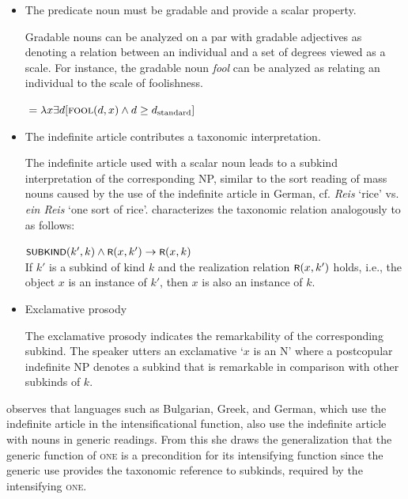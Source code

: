 \documentclass[output=paper,colorlinks,citecolor=brown]{langscibook}
\begin{document}
\begin{itemize}
    \item[C1] The predicate noun must be gradable and provide a scalar property.\smallskip

    Gradable nouns can be analyzed on a par with gradable adjectives as denoting a relation between an individual and a set of degrees viewed as a scale. For instance, the gradable noun \textit{fool} can be analyzed as relating an individual to the scale of foolishness.

    \ea {}${}=\lambda x\exists d[\textsc{fool}(d,x)\wedge d\geq d_{\text{standard}}]$\hfill\citep[42]{Gorishneva2009}
    \z

    \item[C2] The indefinite article contributes a taxonomic interpretation.\smallskip

    The indefinite article used with a scalar noun leads to a subkind interpretation of the corresponding NP, similar to the sort reading of mass nouns caused by the use of the indefinite article in German, cf. \textit{Reis} ‘rice’ vs. \textit{ein Reis} ‘one sort of rice’. \citet{Gorishneva2009} characterizes the taxonomic relation analogously to \citet[74ff.]{Krifka.etal1995a} as follows: 

    \ea $\cnst{subkind}(k', k)\wedge \cnst{r}(x, k')\rightarrow \cnst{r}(x, k)$\smallskip\\
    If $k'$ is a subkind of kind $k$ and the realization relation $\cnst{r}(x, k')$ holds, i.e., the object $x$ is an instance of $k'$, then $x$ is also an instance of $k$.\\\hfill\citep[42]{Gorishneva2009}
    \z

    \item[C3] Exclamative prosody\smallskip

    The exclamative prosody indicates the remarkability of the corresponding subkind. The speaker utters an exclamative ‘$x$ is an N’ where a postcopular indefinite NP denotes a subkind that is remarkable in comparison with other subkinds of $k$.  

    
\end{itemize}

\noindent\citet{Gorishneva2009} observes that languages such as Bulgarian, Greek, and German, which use the indefinite article in the intensificational function, also use the indefinite article with nouns in generic readings. From this she draws the generalization that the generic function of \textsc{one} is a precondition for its intensifying function since the generic use provides the taxonomic reference to subkinds, required by the intensifying \textsc{one}.
\end{document}
